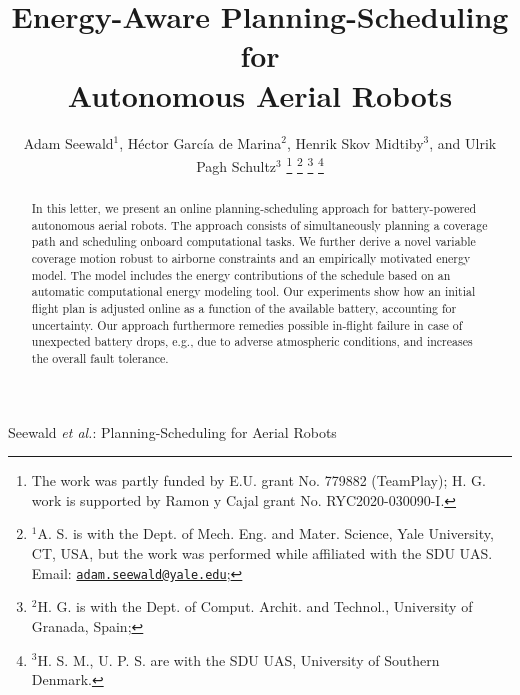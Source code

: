 \documentclass[letterpaper,10pt,journal,twoside]{IEEEtran}
\theoremstyle{definition}
\begin{document}
\title{Energy-Aware Planning-Scheduling for\\Autonomous Aerial Robots}

\author{
  Adam Seewald$^{\text{1}}$, H\'ector Garc\'ia de Marina$^{\text{2}}$, Henrik Skov Midtiby$^{\text{3}}$, and Ulrik Pagh Schultz$^{\text{3}}$
  \thanks{The work was partly funded by E.U. grant No. 779882 (TeamPlay); H. G. work is supported by Ramon y Cajal grant No. RYC2020-030090-I.}
  \thanks{$^{\text{1}}$A. S. is with the Dept. of Mech. Eng. and Mater. Science, Yale University, CT, USA, but the work was performed while affiliated with the SDU UAS. Email: {\tt\footnotesize \href{mailto:adam.seewald@yale.edu}{adam.seewald@yale.edu}};}
  \thanks{$^{\text{2}}$H. G. is with the Dept. of Comput. Archit. and Technol., University of Granada, Spain;} 
  \thanks{$^{\text{3}}$H. S. M.,  U. P. S. are with the SDU UAS, %
  University of Southern Denmark.}
}

{Seewald \MakeLowercase{\textit{et al.}}: Planning-Scheduling for Aerial Robots} 

\maketitle

\vspace*{-4.6ex}

\begin{abstract}
  In this letter, we present an online planning-scheduling approach for battery-powered autonomous aerial robots. The approach consists of simultaneously planning a coverage path and scheduling onboard computational tasks. We further derive a novel variable coverage motion robust to airborne constraints and an empirically motivated energy model. The model includes the energy contributions of the schedule based on an automatic computational energy modeling tool. Our experiments show how an initial flight plan is adjusted online as a function of the available battery, accounting for uncertainty. Our approach furthermore remedies possible in-flight failure in case of unexpected battery drops, e.g., due to adverse atmospheric conditions, and increases the overall fault tolerance.
\end{abstract}
\end{document}
